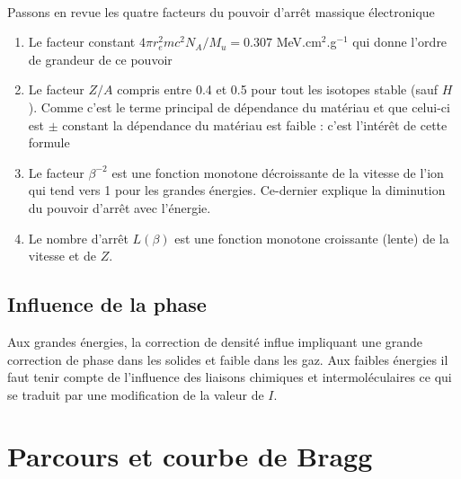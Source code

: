 \ \\

Passons en revue les quatre facteurs du pouvoir d'arrêt massique électronique
\begin{enumerate}
\item Le facteur constant $4\pi r_e^2mc^2N_A/M_u = 0.307$ MeV.cm$^2$.g$^{-1}$ qui donne l'ordre
de grandeur de ce pouvoir
\item Le facteur $Z/A$ compris entre 0.4 et 0.5 pour tout les isotopes stable (sauf $H$). Comme
c'est le terme principal de dépendance du matériau et que celui-ci est $\pm$ constant la dépendance
du matériau est faible : c'est l'intérêt de cette formule
\item Le facteur $\beta^{-2}$ est une fonction monotone décroissante de la vitesse de l'ion qui
tend vers 1 pour les grandes énergies. Ce-dernier explique la diminution du pouvoir d'arrêt 
avec l'énergie. 
\item Le nombre d'arrêt $L(\beta)$ est une fonction monotone croissante (lente) de la vitesse 
et de $Z$.
\end{enumerate}

\subsection*{Influence de la phase}
Aux grandes énergies, la correction de densité influe impliquant une grande correction de phase 
dans les solides et faible dans les gaz. Aux faibles énergies il faut tenir compte de l'influence
des liaisons chimiques et intermoléculaires ce qui se traduit par une modification de la
valeur de $I$.

\section{Parcours et courbe de Bragg} 
